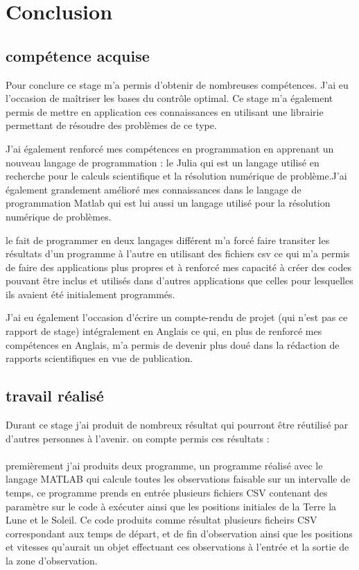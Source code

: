 \documentclass{article} %
\begin{document}
		\newpage
		\section{Conclusion}
		\subsection{compétence acquise}
		Pour conclure ce stage m'a permis d'obtenir de nombreuses compétences.
		 J'ai eu l'occasion de maîtriser les bases du contrôle optimal. Ce stage m'a également permis de mettre en application ces connaissances en utilisant une librairie permettant de résoudre des problèmes de ce type.
		
		J'ai également renforcé mes compétences en programmation en apprenant un nouveau langage de programmation : le Julia qui est un langage utilisé en recherche pour le calculs scientifique et la résolution numérique de problème.J'ai également grandement amélioré mes connaissances dans le langage de programmation Matlab qui est lui aussi un langage utilisé pour la résolution numérique de problèmes.
		
		le fait de programmer en deux langages différent m'a forcé faire transiter les résultats d'un programme à l'autre en utilisant des fichiers csv ce qui m'a permis de faire des applications plus propres et à renforcé mes capacité à créer des codes pouvant être inclus et utilisés dans d'autres applications que celles pour lesquelles ils avaient été initialement programmés.
		
		J'ai eu également l'occasion d'écrire un compte-rendu de projet (qui n'est pas ce rapport de stage) intégralement en Anglais ce qui, en plus de renforcé mes compétences en Anglais, m'a permis de devenir plus doué dans la rédaction de rapports scientifiques en vue de publication.
		
		\subsection{travail réalisé}
		
		Durant ce stage j'ai produit de nombreux résultat qui pourront être réutilisé par d'autres personnes à l'avenir. on compte permis ces résultats : 
		\\ \\
		premièrement j'ai produits deux programme, un programme réalisé avec le langage MATLAB qui calcule toutes les observations faisable sur un intervalle de temps, ce programme prends en entrée plusieurs fichiers CSV contenant des paramètre sur le code à exécuter ainsi que les positions initiales de la Terre la Lune et le Soleil. Ce code produits comme résultat plusieurs ficheirs CSV correspondant aux temps de départ, et de fin d'observation ainsi que les positions et vitesses qu'aurait un objet effectuant ces observations à l'entrée et la sortie de la zone d'observation.
		
\end{document}
